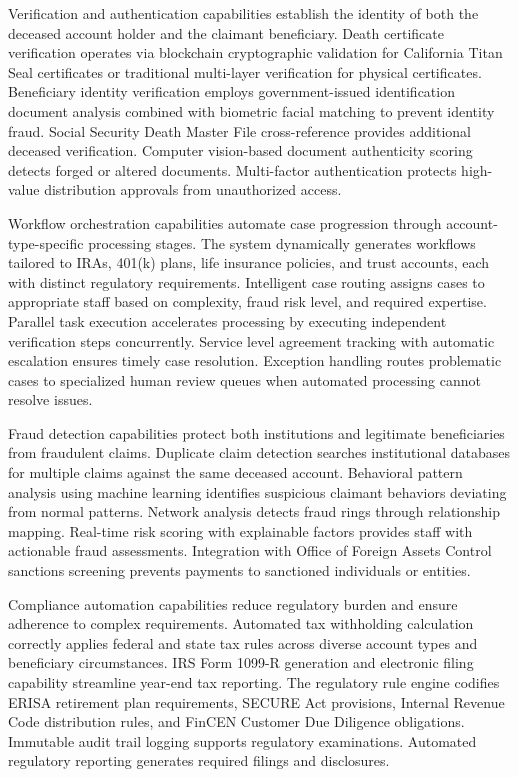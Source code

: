 Verification and authentication capabilities establish the identity of both the deceased account holder and the claimant beneficiary. Death certificate verification operates via blockchain cryptographic validation for California Titan Seal certificates or traditional multi-layer verification for physical certificates. Beneficiary identity verification employs government-issued identification document analysis combined with biometric facial matching to prevent identity fraud. Social Security Death Master File cross-reference provides additional deceased verification. Computer vision-based document authenticity scoring detects forged or altered documents. Multi-factor authentication protects high-value distribution approvals from unauthorized access.

Workflow orchestration capabilities automate case progression through account-type-specific processing stages. The system dynamically generates workflows tailored to IRAs, 401(k) plans, life insurance policies, and trust accounts, each with distinct regulatory requirements. Intelligent case routing assigns cases to appropriate staff based on complexity, fraud risk level, and required expertise. Parallel task execution accelerates processing by executing independent verification steps concurrently. Service level agreement tracking with automatic escalation ensures timely case resolution. Exception handling routes problematic cases to specialized human review queues when automated processing cannot resolve issues.

Fraud detection capabilities protect both institutions and legitimate beneficiaries from fraudulent claims. Duplicate claim detection searches institutional databases for multiple claims against the same deceased account. Behavioral pattern analysis using machine learning identifies suspicious claimant behaviors deviating from normal patterns. Network analysis detects fraud rings through relationship mapping. Real-time risk scoring with explainable factors provides staff with actionable fraud assessments. Integration with Office of Foreign Assets Control sanctions screening prevents payments to sanctioned individuals or entities.

Compliance automation capabilities reduce regulatory burden and ensure adherence to complex requirements. Automated tax withholding calculation correctly applies federal and state tax rules across diverse account types and beneficiary circumstances. IRS Form 1099-R generation and electronic filing capability streamline year-end tax reporting. The regulatory rule engine codifies ERISA retirement plan requirements, SECURE Act provisions, Internal Revenue Code distribution rules, and FinCEN Customer Due Diligence obligations. Immutable audit trail logging supports regulatory examinations. Automated regulatory reporting generates required filings and disclosures.

